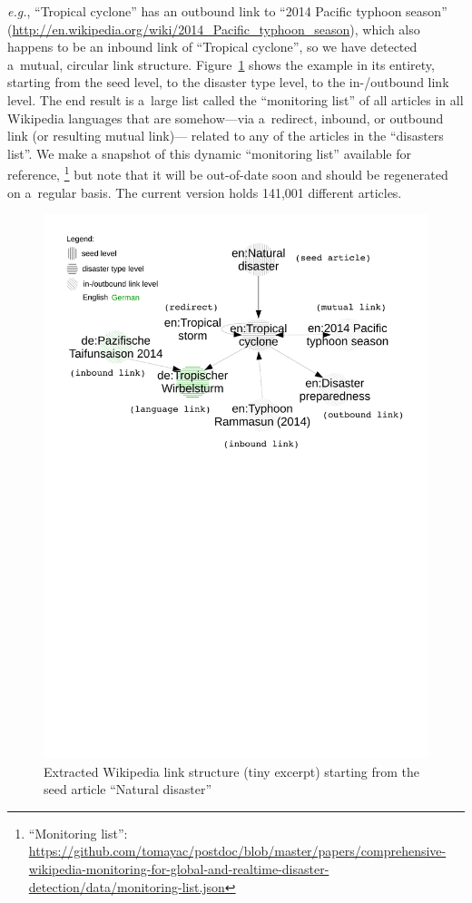 \documentclass[letterpaper]{article}
\begin{document}
\emph{e.g.}, ``Tropical cyclone'' has an outbound link to
``2014 Pacific typhoon season''
(\url{http://en.wikipedia.org/wiki/2014_Pacific_typhoon_season}),
which also happens to be an inbound link of ``Tropical cyclone'',
so we have detected a~mutual, circular link structure.
Figure~\ref{fig:link-structure} shows the example in its entirety,
starting from the seed level, to the disaster type level, to the in-/outbound link level.
The end result is a~large list called the ``monitoring list''
of all articles in all Wikipedia languages
that are somehow---via a~redirect, inbound, or outbound link (or resulting mutual link)---%
related to any of the articles
in the ``disasters list''.
We make a snapshot of this dynamic ``monitoring list'' available for reference,%
\footnote{``Monitoring list'':
\url{https://github.com/tomayac/postdoc/blob/master/papers/comprehensive-wikipedia-monitoring-for-global-and-realtime-disaster-detection/data/monitoring-list.json}}
but note that it will be out-of-date soon and should be regenerated
on a~regular basis.
The current version holds 141,001 different articles.

\begin{figure}[hbt]
  \centering
  \includegraphics[width=0.75\linewidth]{link-structure}
  \caption{Extracted Wikipedia link structure (tiny excerpt) starting from the seed article ``Natural disaster''}
  \label{fig:link-structure}
\end{figure}
\end{document}
